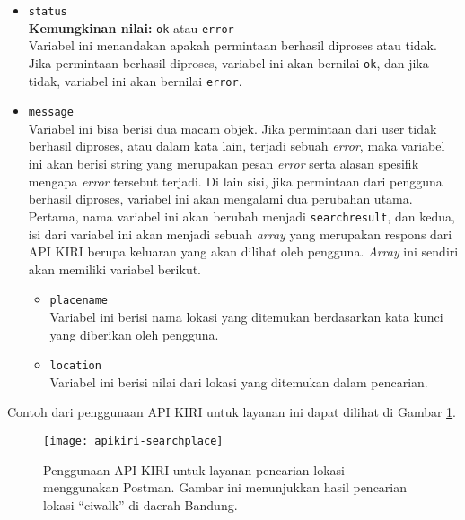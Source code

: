 \begin{itemize}
	\item \verb|status|\\
	\textbf{Kemungkinan nilai:} \verb|ok| atau \verb|error|\\
	Variabel ini menandakan apakah permintaan berhasil diproses atau tidak. Jika permintaan berhasil diproses, variabel ini akan bernilai \verb|ok|, dan jika tidak, variabel ini akan bernilai \verb|error|.
	\item \verb|message|\\
	Variabel ini bisa berisi dua macam objek. Jika permintaan dari user tidak berhasil diproses, atau dalam kata lain, terjadi sebuah \textit{error}, maka variabel ini akan berisi string yang merupakan pesan \textit{error} serta alasan spesifik mengapa \textit{error} tersebut terjadi. Di lain sisi, jika permintaan dari pengguna berhasil diproses, variabel ini akan mengalami dua perubahan utama. Pertama, nama variabel ini akan berubah menjadi \verb|searchresult|, dan kedua, isi dari variabel ini akan menjadi sebuah \textit{array} yang merupakan respons dari API KIRI berupa keluaran yang akan dilihat oleh pengguna. \textit{Array} ini sendiri akan memiliki variabel berikut.
	
	\begin{itemize}
		\item \verb|placename|\\
		Variabel ini berisi nama lokasi yang ditemukan berdasarkan kata kunci yang diberikan oleh pengguna.
		\item \verb|location|\\
		Variabel ini berisi nilai \latlon\xspace dari lokasi yang ditemukan dalam pencarian.
	\end{itemize}
	
\end{itemize}
\noindent\newline %
Contoh dari penggunaan API KIRI untuk layanan ini dapat dilihat di Gambar \ref{fig:kiri-api-searchplace-usage}.

\begin{figure}[t]
    \centering
    \texttt{[image: apikiri-searchplace]}
    \caption[Penggunaan API KIRI untuk layanan pencarian lokasi]{Penggunaan API KIRI untuk layanan pencarian lokasi menggunakan Postman. Gambar ini menunjukkan hasil pencarian lokasi ``ciwalk'' di daerah Bandung.}
    \label{fig:kiri-api-searchplace-usage}
\end{figure}

